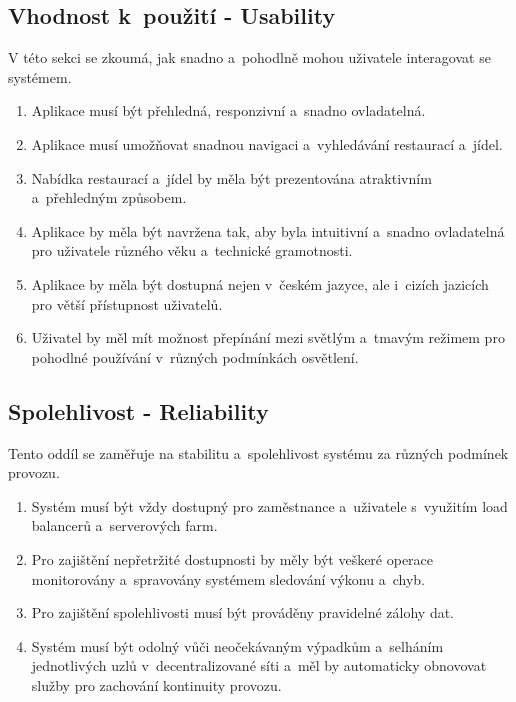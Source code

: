 	\subsection{Vhodnost k~použití - Usability}  

	V této sekci se zkoumá, jak snadno a~pohodlně mohou uživatele
	interagovat se systémem. 

	\begin{enumerate}[noitemsep,topsep=0pt]
		\item Aplikace musí být přehledná, responzivní a~snadno ovladatelná.
    	\item Aplikace musí umožňovat snadnou navigaci a~vyhledávání restaurací a~jídel.
    	\item Nabídka restaurací a~jídel by měla být prezentována atraktivním a~přehledným způsobem.
    	\item Aplikace by měla být navržena tak, aby byla intuitivní a~snadno ovladatelná pro uživatele různého věku a~technické gramotnosti.
    	\item Aplikace by měla být dostupná nejen v~českém jazyce, ale i~cizích jazicích pro větší přístupnost uživatelů.
    	\item Uživatel by měl mít možnost přepínání mezi světlým a~tmavým režimem pro pohodlné používání v~různých podmínkách osvětlení.
    \end{enumerate}

	\subsection{Spolehlivost - Reliability}

	Tento oddíl se zaměřuje na stabilitu a~spolehlivost systému za různých podmínek provozu. 

	\begin{enumerate}[noitemsep,topsep=0pt]
    	\item Systém musí být vždy dostupný pro zaměstnance a~uživatele s~využitím load balancerů a~serverových farm.    	
		\item Pro zajištění nepřetržité dostupnosti by měly být veškeré operace monitorovány a~spravovány systémem sledování výkonu a~chyb.
    	\item Pro zajištění spolehlivosti musí být prováděny pravidelné zálohy dat.
		\item Systém musí být odolný vůči neočekávaným výpadkům a~selháním jednotlivých uzlů v~decentralizované síti a~měl by automaticky obnovovat služby pro zachování kontinuity provozu.
	\end{enumerate}

